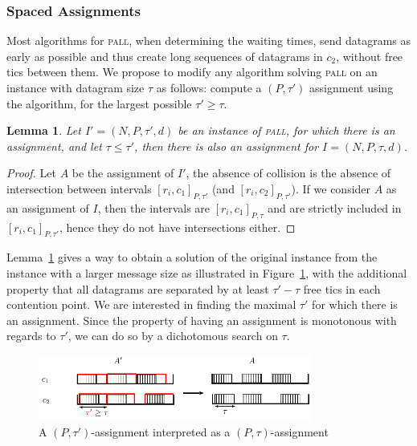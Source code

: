 \documentclass[a4paper,10pt]{journal}
\newtheorem{lemma}[theorem]{Lemma}
\newcommand\pall{\textsc{pall}\xspace}
\begin{document}
    
    \subsubsection{Spaced Assignments}

    Most algorithms for \pall, when determining the waiting times, send datagrams as early as possible
    and thus create long sequences of datagrams in $c_2$, without free tics between them. We propose to modify any algorithm solving \pall on an instance with datagram size $\tau$ as follows: compute a $(P,\tau')$ assignment using the algorithm, for the largest possible $\tau' \geq \tau$. 

    \begin{lemma}\label{lemma:smaller_tau}
    Let $I' = (N,P,\tau',d)$ be an instance of \pall, for which there is an assignment, and let 
    $\tau \leq \tau'$, then there is also an assignment for $I = (N,P,\tau,d)$.
    \end{lemma}  
    \begin{proof}
    Let $A$ be the assignment of $I'$, the absence of collision is the absence of 
    intersection between intervals $[r_i,c_1]_{P,\tau'}$ (and $[r_i,c_2]_{P,\tau'}$). 
    If we consider $A$ as an assignment of $I$, then the intervals are $[r_i,c_1]_{P,\tau}$ and 
    are strictly included in $[r_i,c_1]_{P,\tau'}$, hence they do not have intersections either. 
    \end{proof}


     Lemma~\ref{lemma:smaller_tau} gives a way to obtain a solution of the original instance from the instance with a larger message size as illustrated in Figure~\ref{fig:space}, with the additional property that all datagrams are separated
    by at least $\tau' - \tau$ free tics in each contention point. We are interested in finding the maximal $\tau'$
    for which there is an assignment. Since the property of having an assignment is monotonous with regards to $\tau'$,
    we can do so by a dichotomous search on $\tau$.

           \begin{figure}
       \begin{center}
      \includegraphics[width = 0.8\textwidth]{space.pdf}
      \end{center} 
      \caption{A $(P,\tau')$-assignment interpreted as a $(P,\tau)$-assignment}
      \label{fig:space}   
     \end{figure}   
\end{document}
